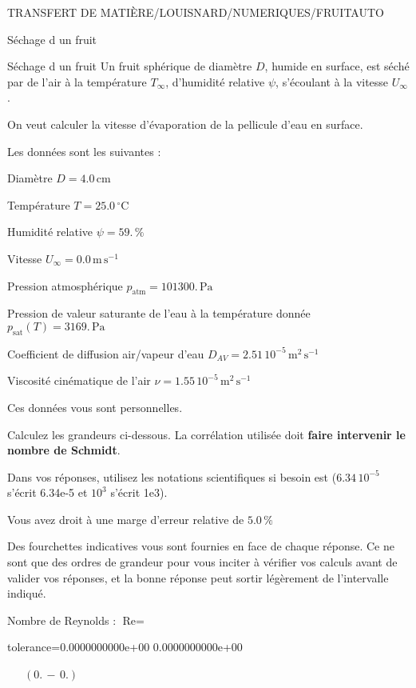 \documentclass[12pt]{article}
\begin{document}
\begin{quiz}{TRANSFERT DE MATIÈRE/LOUISNARD/NUMERIQUES/FRUITAUTO}
\begin{cloze}{Séchage d un fruit}
\end{cloze} 


 \begin{cloze}{Séchage d un fruit} 
Un fruit sphérique de diamètre $D$, humide en surface, est séché par de l'air à la température $T_\infty$, d'humidité relative $\psi$, s'écoulant à la vitesse $U_\infty$.

On veut calculer la vitesse d'évaporation de la pellicule d'eau en surface.

 

Les données sont les suivantes :

 

Diamètre $D = 4.0\,  \mathrm{cm} $

Température $T = 25.0\,  \mathrm{^\circ\mathrm{C}} $

Humidité relative $\psi = 59.\, \% $

Vitesse $U_\infty = 0.0\,  \mathrm{m}\,  \mathrm{s}^{-1} $

Pression atmosphérique $p_{\text{atm}} = 101300.\,  \mathrm{Pa} $

Pression de valeur saturante de l’eau à la température donnée $p_{\text{sat}}(T) = 3169.\,  \mathrm{Pa} $

Coefficient de diffusion air/vapeur d’eau $D_{AV} =  2.51 \, 10^{-5} \,  \mathrm{m}^{2}\,  \mathrm{s}^{-1} $

Viscosité cinématique de l’air $\nu =  1.55 \, 10^{-5} \,  \mathrm{m}^{2}\,  \mathrm{s}^{-1} $

Ces données vous sont personnelles.

 

Calculez les grandeurs ci-dessous. La corrélation utilisée doit \textbf{faire intervenir le nombre de Schmidt}.

Dans vos réponses, utilisez les notations scientifiques si besoin est ($6.34\, 10^{-5}$ s'écrit 6.34e-5 et $10^{3}$ s'écrit 1e3).

Vous avez droit à une marge d'erreur relative de $5.0\, \% $

Des fourchettes indicatives vous sont fournies en face de chaque réponse. Ce ne sont que des ordres de grandeur pour vous inciter à vérifier vos calculs avant de valider vos réponses, et la bonne réponse peut sortir légèrement de l'intervalle indiqué.

 

Nombre de Reynolds : $\text{Re} =  $
\begin{numerical}[points=1] 
\item[tolerance={0.0000000000e+00}] 0.0000000000e+00 
\end{numerical} 
 $\,$ 
 $ \quad (0. \, - \, 0.) $ 


\end{cloze}
\end{quiz}
\end{document}
